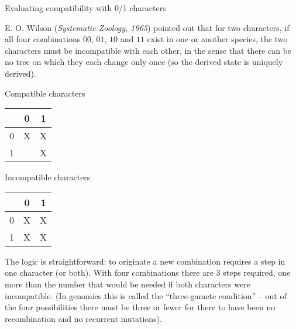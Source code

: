 \documentclass[bluish,slideColor,colorBG,pdf]{prosper}
\begin{document}
\begin{slide}[Replace]{Evaluating compatibility with 0/1 characters}

E. O. Wilson ({\it Systematic Zoology, 1965}) pointed out that
for two characters,
if all four combinations  $00$, $01$, $10$ and $11$ exist in one or
another species, the two characters must be incompatible with each
other, in the sense that there can be no tree on which they each change
only once (so the derived state is uniquely derived).
\medskip

\begin{center}
\parbox[t]{1.0in}{
Compatible characters\\

\begin{tabular}{c | c c |}
  & 0  & 1 \\
\hline
 0  &\raisebox{2pt}{\strut} X  & X \\
 1  &    & \raisebox{2pt}{\strut}X \\
\hline
\end{tabular}
} \hspace{1.0in}
\parbox[t]{1.0in}{
Incompatible characters\\

\begin{tabular}{c | c c |}
  & 0  & 1 \\
\hline
 0  & \raisebox{2pt}{\strut}X  & X \\
 1  & \raisebox{2pt}{\strut}X  & X \\
\hline
\end{tabular}
}
\end{center}
\medskip

The logic is straightforward: to originate a new combination requires
a step in one character (or both).  With four combinations there are 3 steps
required, one more than the number that would be needed if both characters were
incompatible.  (In genomics this is called the ``three-gamete condition'' --
out of the four possibilities there must be three or fewer for there to have
been no recombination and no recurrent mutations).

\end{slide}
\end{document}
